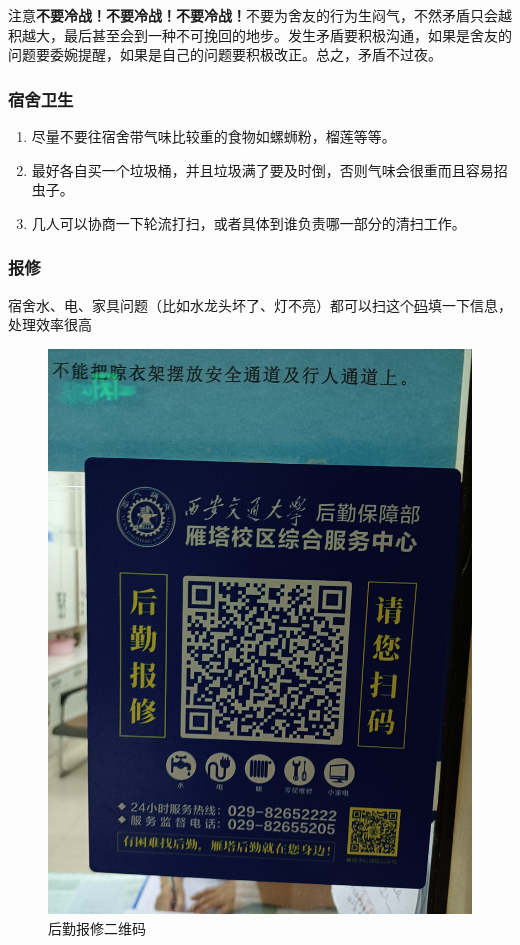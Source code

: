 \documentclass[zihao=-4,fontset=none]{Beautybook-CN}
\begin{document}
\begin{theorem}
    注意\textbf{不要冷战！不要冷战！不要冷战！}不要为舍友的行为生闷气，不然矛盾只会越积越大，最后甚至会到一种不可挽回的地步。发生矛盾要积极沟通，如果是舍友的问题要委婉提醒，如果是自己的问题要积极改正。总之，矛盾不过夜。
\end{theorem}

\subsubsection{宿舍卫生}
\begin{enumerate}
\item 尽量不要往宿舍带气味比较重的食物如螺蛳粉，榴莲等等。
\item 最好各自买一个垃圾桶，并且垃圾满了要及时倒，否则气味会很重而且容易招虫子。
\item 几人可以协商一下轮流打扫，或者具体到谁负责哪一部分的清扫工作。
\end{enumerate}
\subsubsection{报修}

宿舍水、电、家具问题（比如水龙头坏了、灯不亮）都可以扫这个\hyperref[fig:QR]{码}填一下信息，处理效率很高
\begin{figure}[htbp]
    \centering
    \includegraphics[width=1\linewidth]{media/image6.jpg}
    \caption{后勤报修二维码}
    \label{fig:QR}
\end{figure}
\end{document}
